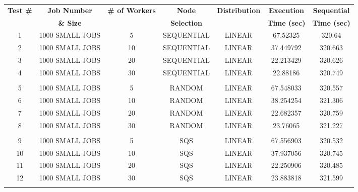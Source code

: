 \documentclass{article}
\begin{document}
\begin{table}

\hspace*{-4em}
\begin{tabular}{|c | c | c | c | c | c | c |}
\hline
\textbf{Test \#} & \textbf{Job Number} & \textbf{\# of Workers} & \textbf{Node} & \textbf{Distribution} & \textbf{Execution} & \textbf{Sequential} \\

 & \textbf{\& Size} &  & \textbf{Selection} &  & \textbf{Time (sec)} & \textbf{Time (sec)} \\

\hline
1  & 1000 SMALL JOBS & 5  & SEQUENTIAL & LINEAR            & 67.52325  & 320.64  \\ \hline
2  & 1000 SMALL JOBS & 10 & SEQUENTIAL & LINEAR            & 37.449792 & 320.663 \\ \hline
3  & 1000 SMALL JOBS & 20 & SEQUENTIAL & LINEAR            & 22.213429 & 320.626 \\ \hline
4  & 1000 SMALL JOBS & 30 & SEQUENTIAL & LINEAR            & 22.88186  & 320.749 \\ \hline
   &                 &    &            &                   &           &         \\ \hline
5  & 1000 SMALL JOBS & 5  & RANDOM     & LINEAR            & 67.548033 & 320.557 \\ \hline
6  & 1000 SMALL JOBS & 10 & RANDOM     & LINEAR            & 38.254254 & 321.306 \\ \hline
7  & 1000 SMALL JOBS & 20 & RANDOM     & LINEAR            & 22.682357 & 320.759 \\ \hline
8  & 1000 SMALL JOBS & 30 & RANDOM     & LINEAR            & 23.76065  & 321.227 \\ \hline
   &                 &    &            &                   &           &         \\ \hline
9  & 1000 SMALL JOBS & 5  & SQS        & LINEAR            & 67.556903 & 320.532 \\ \hline
10 & 1000 SMALL JOBS & 10 & SQS        & LINEAR            & 37.937056 & 320.745 \\ \hline
11 & 1000 SMALL JOBS & 20 & SQS        & LINEAR            & 22.250906 & 320.485 \\ \hline
12 & 1000 SMALL JOBS & 30 & SQS        & LINEAR            & 23.883818 & 321.599 \\ \hline
   &                 &    &            &                   &           &         \\ \hline

\end{tabular}
\end{table}
\end{document}

